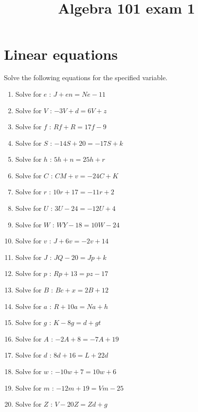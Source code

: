 \documentclass{article}
\begin{document}
    \title{Algebra 101 exam 1} 
 \date{\vspace{-5ex}} 
 \maketitle

    \section{Linear equations}
    Solve the following equations for the specified variable.
    \begin{multicols}{2}
    \begin{enumerate}
    \item Solve for $e$ : $J + e n = N e -11$
\item Solve for $V$ : $- 3 V + d = 6 V + z$
\item Solve for $f$ : $R f + R = 17 f -9$
\item Solve for $S$ : $- 14 S + 20 = - 17 S + k$
\item Solve for $h$ : $5 h + n = 25 h + r$
\item Solve for $C$ : $C M + v = - 24 C + K$
\item Solve for $r$ : $10 r + 17 = - 11 r + 2$
\item Solve for $U$ : $3 U -24 = - 12 U + 4$
\item Solve for $W$ : $W Y -18 = 10 W -24$
\item Solve for $v$ : $J + 6 v = - 2 v + 14$
\item Solve for $J$ : $J Q -20 = J p + k$
\item Solve for $p$ : $R p + 13 = p z -17$
\item Solve for $B$ : $B c + x = 2 B + 12$
\item Solve for $a$ : $R + 10 a = N a + h$
\item Solve for $g$ : $K - 8 g = d + g t$
\item Solve for $A$ : $- 2 A + 8 = - 7 A + 19$
\item Solve for $d$ : $8 d + 16 = L + 22 d$
\item Solve for $w$ : $- 10 w + 7 = 10 w + 6$
\item Solve for $m$ : $- 12 m + 19 = V m -25$
\item Solve for $Z$ : $V - 20 Z = Z d + g$
    \end{enumerate}
    \end{multicols}
    
\end{document}
